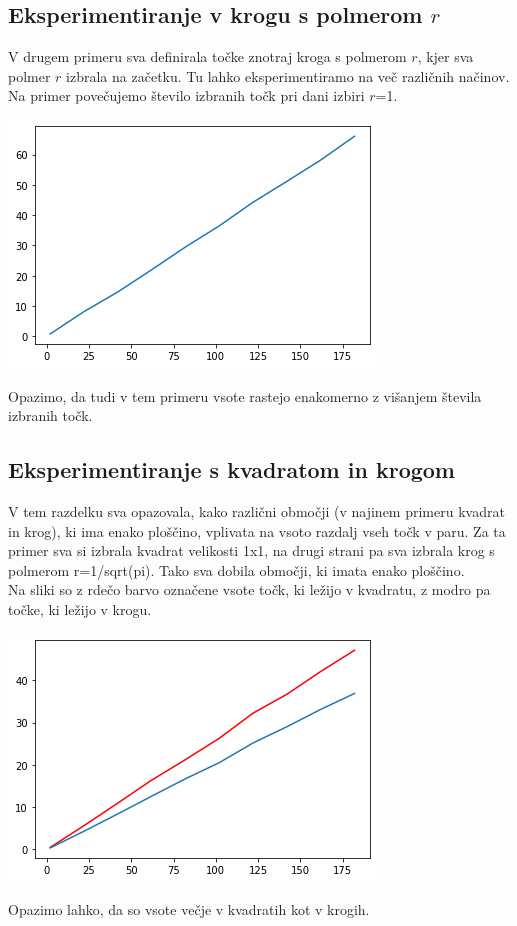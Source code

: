 \documentclass[12pt, a4paper]{article}
\begin{document}
\subsection{Eksperimentiranje v krogu s polmerom $r$}
V drugem primeru sva definirala točke znotraj kroga s polmerom $r$, kjer sva polmer $r$ izbrala na začetku. Tu lahko eksperimentiramo na več različnih načinov.
Na primer povečujemo število izbranih točk pri dani izbiri $r$=1.
\begin{center}
\includegraphics{krog_s_danim_polmerom.png}
\end{center}
Opazimo, da tudi v tem primeru vsote rastejo enakomerno z višanjem števila izbranih točk.
	
\newpage

\subsection{Eksperimentiranje s kvadratom in krogom}
V tem razdelku sva opazovala, kako različni območji (v najinem primeru kvadrat in krog), ki ima enako ploščino, vplivata na vsoto razdalj vseh točk v paru. Za ta primer sva si izbrala kvadrat velikosti 1x1, na drugi strani pa sva izbrala krog s polmerom r=1/sqrt(pi). Tako sva dobila območji, ki imata enako ploščino.\\

Na sliki so z rdečo barvo označene vsote točk, ki ležijo v kvadratu, z modro pa točke, ki ležijo v krogu.\\
\begin{center}
\includegraphics{primerjava_krog_kvadrat.png}
\end{center}
Opazimo lahko, da so vsote večje v kvadratih kot v krogih.\\
\end{document}
